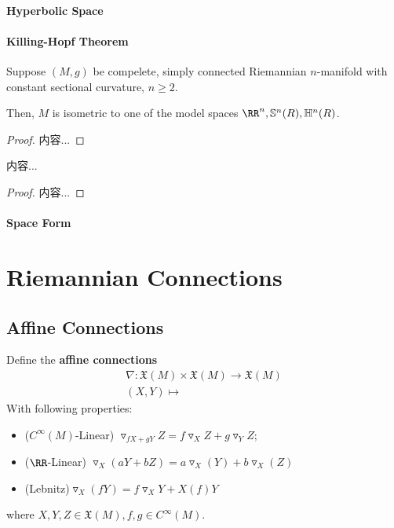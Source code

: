 \documentclass[Total.tex]{subfiles}
\begin{document}
				\subsubsection{Hyperbolic Space}
				\subsubsection{Killing-Hopf Theorem}
					\begin{theorem}
						Suppose $(M,g)$ be compelete, simply connected Riemannian $n$-manifold with constant sectional curvature, $n\geq 2$.
						
						Then, $M$ is isometric to one of the model spaces $\RR^n,\mathbb{S}^n(R),\mathbb{H}^n(R)$.
					\end{theorem}
					\begin{proof}
						内容...
					\end{proof}
					
					\begin{corollary}
						内容...
					\end{corollary}
					\begin{proof}
						内容...
					\end{proof}
				\subsubsection{Space Form}
	\chapter{Riemannian Connections}
		\section{Affine Connections}
			\begin{Def}
				Define the \textbf{affine connections}
				\begin{gather*}
					\nabla:\mathfrak{X}(M)\times \mathfrak{X}(M)\rightarrow \mathfrak{X}(M)\\
					(X,Y)\mapsto 
				\end{gather*}
				With following properties:
				\begin{itemize}
					\item ($C^\infty(M)$-Linear) $\triangledown_{fX+gY}Z=f\triangledown_X Z+g\triangledown_{Y}Z$;
					\item($\RR$-Linear) $\triangledown_{X}(aY+bZ)=a\triangledown_X(Y)+b\triangledown_X(Z)$
					\item (Lebnitz)$\triangledown_{X}(fY)=f\triangledown_X Y+X(f)Y$
				\end{itemize}
				where $X,Y,Z\in \mathfrak{X}(M),f,g\in C^\infty(M)$.
			\end{Def}
			
\end{document}
